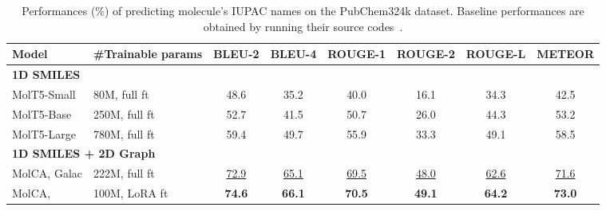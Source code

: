 \documentclass[11pt]{article}
\begin{document}
\begin{table*}[t]
\small
\centering
\begin{tabular}{llcccccc} \toprule
Model & \#Trainable params       & BLEU-2               & BLEU-4               & ROUGE-1              & ROUGE-2              & ROUGE-L              & METEOR               \\ \midrule
\multicolumn{2}{l}{\textbf{1D SMILES}}            & \multicolumn{1}{l}{} & \multicolumn{1}{l}{} & \multicolumn{1}{l}{} & \multicolumn{1}{l}{} & \multicolumn{1}{l}{} & \multicolumn{1}{l}{} \\
MolT5-Small            & 80M, full ft                      & 48.6                 & 35.2                 & 40.0                 & 16.1                 & 34.3                 & 42.5                 \\
MolT5-Base             & 250M, full ft                     & 52.7                 & 41.5                 & 50.7                 & 26.0                 & 44.3                 & 53.2                 \\
MolT5-Large            & 780M, full ft                     & 59.4                 & 49.7                 & 55.9                 & 33.3                 & 49.1                 & 58.5                 \\\midrule
\multicolumn{2}{l}{\textbf{1D SMILES + 2D Graph}} & \multicolumn{1}{l}{} & \multicolumn{1}{l}{} & \multicolumn{1}{l}{} & \multicolumn{1}{l}{} & \multicolumn{1}{l}{} & \multicolumn{1}{l}{} \\
MolCA, Galac  & 222M, full ft              & \underline{72.9}                 & \underline{65.1}                 & \underline{69.5}                 & \underline{48.0}                 & \underline{62.6}                 & \underline{71.6}                 \\
MolCA,         & 100M, LoRA ft                     & \textbf{74.6}        & \textbf{66.1}        & \textbf{70.5}        & \textbf{49.1}        & \textbf{64.2}        & \textbf{73.0}  \\ \bottomrule
\end{tabular}
\caption{Performances (\%) of predicting molecule's IUPAC names on the PubChem324k dataset. Baseline performances are obtained by running their source codes~\citep{MolT5}.}
 \vspace{-4mm}
\label{tab:iupac}
\end{table*}
\end{document}
